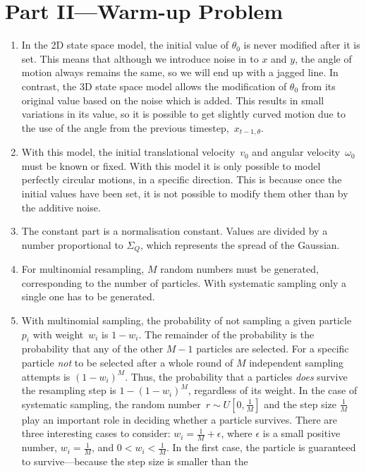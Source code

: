 \documentclass[a4paper,12pt]{article}
\begin{document}
\section{Part II---Warm-up Problem}
\begin{enumerate}
\item In the 2D state space model, the initial value of $\theta_0$ is never
  modified after it is set. This means that although we introduce noise in to
  $x$ and $y$, the angle of motion always remains the same, so we will end up
  with a jagged line. In contrast, the 3D state space model allows the
  modification of $\theta_0$ from its original value based on the noise which is
  added. This results in small variations in its value, so it is possible to get
  slightly curved motion due to the use of the angle from the previous
  timestep,~$x_{t-1,\theta}$.
\item With this model, the initial translational velocity~$v_0$ and angular
  velocity~$\omega_0$ must be known or fixed. With this model it is only
  possible to model perfectly circular motions, in a specific
  direction. This is because once the initial values have been set, it is not
  possible to modify them other than by the additive noise.
\item The constant part is a normalisation constant. Values are divided by a
  number proportional to $\Sigma_Q$, which represents the spread of the
  Gaussian.
\item For multinomial resampling, $M$ random numbers must be generated,
  corresponding to the number of particles. With systematic sampling only a
  single one has to be generated.
\item With multinomial sampling, the probability of not sampling a given
  particle~$p_i$ with weight~$w_i$ is $1-w_i$. The remainder of the probability
  is the probability that any of the other $M-1$ particles are selected. For a
  specific particle \emph{not} to be selected after a whole round of $M$ independent
  sampling attempts is $(1-w_i)^M$. Thus, the probability that a particles
  \emph{does} survive the resampling step is $1-(1-w_i)^M$, regardless of its
  weight. In the case of systematic sampling, the random number~$r\sim
  U[0,\frac{1}{M}]$ and the step size $\frac{1}{M}$ play an important role in
  deciding whether a particle survives. There are three interesting cases to
  consider: $w_i=\frac{1}{M}+\epsilon$, where $\epsilon$ is a small positive
  number, $w_i=\frac{1}{M}$, and $0<w_i<\frac{1}{M}$. In the first case, the
  particle is guaranteed to survive---because the step size is smaller than the

\end{enumerate}
\end{document}
